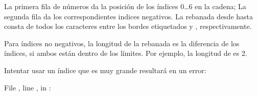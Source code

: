 \documentclass[a4,10pt,spanish]{sphinxmanual}
\begin{document}
\begin{sphinxVerbatim}[commandchars=\\\{\}]
             
                   
          
\end{sphinxVerbatim}

\sphinxAtStartPar
La primera fila de números da la posición de los índices 0…6 en la cadena; La segunda fila da los correspondientes indices negativos. La rebanada desde  hasta  consta de todos los caracteres entre los bordes etiquetados  y , respectivamente.

\sphinxAtStartPar
Para índices no negativos, la longitud de la rebanada es la diferencia de los índices, si ambos están dentro de los límites. Por ejemplo, la longitud de  es 2.

\sphinxAtStartPar
Intentar usar un índice que es muy grande resultará en un error:

\begin{sphinxVerbatim}[commandchars=\\\{\}]
\PYG{p}{[}\PYG{p}{]}  
  File , line , in 
: 
\end{sphinxVerbatim}
\end{document}
